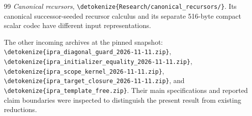 \documentclass[11pt,letterpaper]{article}
\theoremstyle{definition}
\theoremstyle{remark}
\newcommand{\file}[1]{\expandafter\nolinkurl\expandafter{\detokenize{#1}}}
\begin{document}
\begin{thebibliography}{99}
\emph{Canonical recursors},
\file{Research/canonical_recursors/}.
Its canonical successor-seeded recursor calculus and its separate 516-byte
compact scalar codec have different input representations.

The other incoming archives at the pinned snapshot:
\file{ipra_diagonal_guard_2026-11-11.zip},
\file{ipra_initializer_equality_2026-11-11.zip},
\file{ipra_scope_kernel_2026-11-11.zip},
\file{ipra_target_closure_2026-11-11.zip}, and
\file{ipra_template_free.zip}.
Their main specifications and reported claim boundaries were inspected
to distinguish the present result from existing reductions.
\end{thebibliography}
\end{document}
